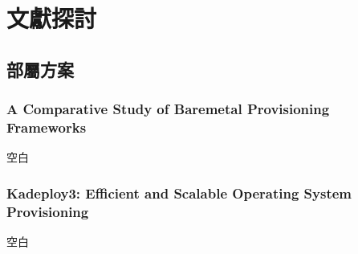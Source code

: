 \chapter{文獻探討}
\section{部屬方案}
\subsection{A Comparative Study of Baremetal Provisioning Frameworks}
空白

\subsection{ Kadeploy3: Efficient and Scalable Operating System Provisioning}
空白

